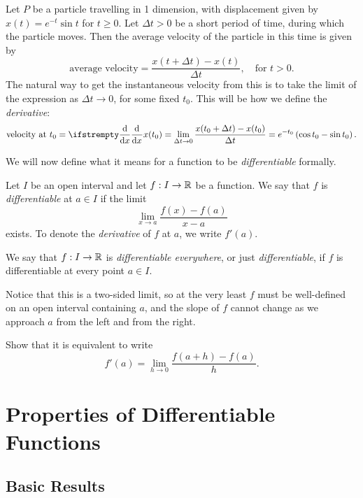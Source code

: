 \documentclass[../analysis1.tex]{subfiles}
\begin{document}
\begin{example}
    Let $P$ be a particle travelling in 1 dimension, with displacement given by $x(t)=e^{-t}\sin t$ for $t\ge 0$. Let $\Delta t>0$ be a short period of time, during which the particle moves. Then the average velocity of the particle in this time is given by
    \[\text{average velocity} = \frac{x(t+\Delta t)-x(t)}{\Delta t},\quad\text{for }t>0.\]
    The natural way to get the instantaneous velocity from this is to take the limit of the expression as $\Delta t\to 0$, for some fixed $t_0$. This will be how we define the \textit{derivative}:
    \[\text{velocity at }t_0=\deriv[]{}{x}x(t_0)=\lim_{\Delta t\to 0}\frac{x(t_0+\Delta t)-x(t_0)}{\Delta t}=e^{-t_0}\left(\cos t_0 - \sin t_0\right).\]
\end{example}

We will now define what it means for a function to be \textit{differentiable} formally.
\begin{definition}
    \begin{shaded*}
        Let $I$ be an open interval and let $f:I\to\mathbb{R}$ be a function. We say that $f$ is \textit{differentiable} at $a\in I$ if the limit
        \[\lim_{x\to a}\frac{f(x)-f(a)}{x-a}\]
        exists. To denote the \textit{derivative} of $f$ at $a$, we write $f'(a)$.
    \end{shaded*}
\end{definition}
We say that $f:I\to\mathbb{R}$ is \textit{differentiable everywhere}, or just \textit{differentiable}, if $f$ is differentiable at every point $a\in I$.

\begin{remark}
    Notice that this is a two-sided limit, so at the very least $f$ must be well-defined on an open interval containing $a$, and the slope of $f$ cannot change as we approach $a$ from the left and from the right.
\end{remark}

\begin{exercise*}
    Show that it is equivalent to write \[f'(a)=\lim_{h\to 0}\frac{f(a+h)-f(a)}{h}.\]
\end{exercise*}

\section{Properties of Differentiable Functions}

\subsection{Basic Results}
\end{document}
